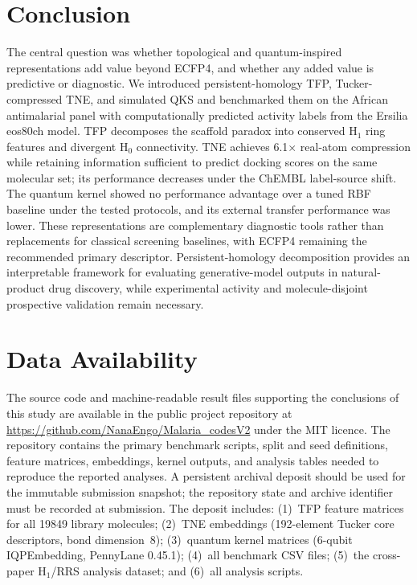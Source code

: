 \documentclass[11pt,a4paper]{article}
\begin{document}
\section{Conclusion}

The central question was whether topological and quantum-inspired representations add value beyond ECFP4, and whether any added value is predictive or diagnostic. We introduced persistent-homology TFP, Tucker-compressed TNE, and simulated QKS and benchmarked them on the African antimalarial panel with computationally predicted activity labels from the Ersilia eos80ch model. TFP decomposes the scaffold paradox into conserved H$_1$ ring features and divergent H$_0$ connectivity. TNE achieves \num{6.1}$\times$ real-atom compression while retaining information sufficient to predict docking scores on the same molecular set; its performance decreases under the ChEMBL label-source shift. The quantum kernel showed no performance advantage over a tuned RBF baseline under the tested protocols, and its external transfer performance was lower. These representations are complementary diagnostic tools rather than replacements for classical screening baselines, with ECFP4 remaining the recommended primary descriptor. Persistent-homology decomposition provides an interpretable framework for evaluating generative-model outputs in natural-product drug discovery, while experimental activity and molecule-disjoint prospective validation remain necessary.


\section*{Data Availability}

The source code and machine-readable result files supporting the conclusions of this study are available in the public project repository at \url{https://github.com/NanaEngo/Malaria_codesV2} under the MIT licence. The repository contains the primary benchmark scripts, split and seed definitions, feature matrices, embeddings, kernel outputs, and analysis tables needed to reproduce the reported analyses. A persistent archival deposit should be used for the immutable submission snapshot; the repository state and archive identifier must be recorded at submission. The deposit includes: (1)~TFP feature matrices for all \num{19849} library molecules; (2)~TNE embeddings (\num{192}-element Tucker core descriptors, bond dimension~8); (3)~quantum kernel matrices (6-qubit IQPEmbedding, PennyLane 0.45.1); (4)~all benchmark CSV files; (5)~the cross-paper H$_1$/RRS analysis dataset; and (6)~all analysis scripts.
\end{document}
